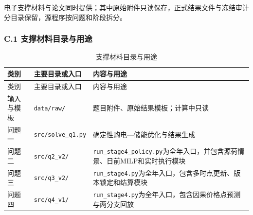 \documentclass[zihao=-4,a4paper,UTF8,fontset=none]{ctexart}
\begin{document}
电子支撑材料与论文同时提供；其中原始附件只读保存，正式结果文件与冻结审计分目录保留，源程序按问题和阶段拆分。

\par\pagebreak[2]\subsubsection*{C.1 支撑材料目录与用途}

\begingroup\renewcommand{\tablename}{附表}\renewcommand{\thetable}{C-1}

\begin{longtable}[]{@{}
  >{\centering\arraybackslash}p{}
  >{\centering\arraybackslash}p{}
  >{\centering\arraybackslash}p{}@{}}
\caption{支撑材料目录与用途}\label{tab:appendix-C-1}\tabularnewline
\toprule\noalign{}
\begin{minipage}[b]{\linewidth}\centering
类别
\end{minipage} & \begin{minipage}[b]{\linewidth}\centering
主要目录或入口
\end{minipage} & \begin{minipage}[b]{\linewidth}\centering
内容与用途
\end{minipage} \\
\midrule\noalign{}
\endfirsthead
\toprule\noalign{}
\begin{minipage}[b]{\linewidth}\centering
类别
\end{minipage} & \begin{minipage}[b]{\linewidth}\centering
主要目录或入口
\end{minipage} & \begin{minipage}[b]{\linewidth}\centering
内容与用途
\end{minipage} \\
\midrule\noalign{}
\endhead
\bottomrule\noalign{}
\endlastfoot
输入与模板 & \texttt{data/raw/} & 题目附件、原始结果模板；计算中只读 \\
问题一 & \texttt{src/solve\_q1.py} & 确定性购电---储能优化与结果生成 \\
问题二 & \texttt{src/q2\_v2/} & \texttt{run\_stage4\_policy.py}为全年入口，并包含源荷情景、日前MILP和实时执行模块 \\
问题三 & \texttt{src/q3\_v2/} & \texttt{run\_stage4.py}为全年入口，包含多时点更新、版本锁定和结算模块 \\
问题四 & \texttt{src/q4\_v1/} & \texttt{run\_stage4.py}为全年入口，包含因果价格点预测与两分支回放 \\

\end{longtable}
\end{document}
